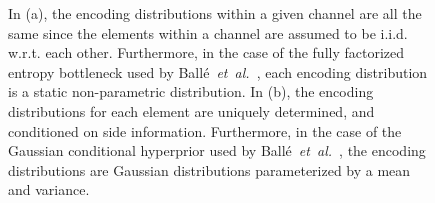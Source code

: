 \begin{figure}[htbp]
{    In (a), the encoding distributions within a given channel are all the same since the elements within a channel are assumed to be i.i.d. w.r.t. each other.
    Furthermore, in the case of the fully factorized entropy bottleneck used by Ballé~\emph{et~al.}~\cite{balle2018variational}, each encoding distribution is a static non-parametric distribution.
    In (b), the encoding distributions for each element are uniquely determined, and conditioned on side information.
    Furthermore, in the case of the Gaussian conditional hyperprior used by Ballé~\emph{et~al.}~\cite{balle2018variational}, the encoding distributions are Gaussian distributions parameterized by a mean and variance.%
  }
  \label{fig:intro/encoding-distributions}
\end{figure}



